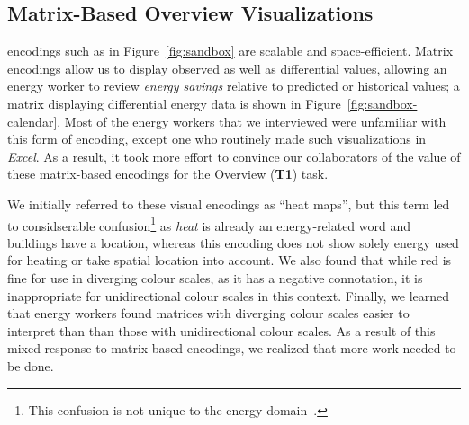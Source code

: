 \documentclass[journal]{vgtc}                %
\newcommand{\bqstart}[1]{\vspace{1mm} \noindent{\textbf{#1}}}
\begin{document}
\subsection{Matrix-Based Overview Visualizations}
\label{design-matrix}


\bqstart{Time series matrix} encodings such as in Figure~\ref{fig:sandbox} are scalable and space-efficient.
Matrix encodings allow us to display observed as well as differential values, allowing an energy worker to review {\it energy savings} relative to predicted or historical values; a matrix displaying differential energy data is shown in Figure~\ref{fig:sandbox-calendar}. 
Most of the energy workers that we interviewed were unfamiliar with this form of encoding, except one who routinely made such visualizations in {\it Excel}. 
As a result, it took more effort to convince our collaborators of the value of these matrix-based encodings for the Overview ({\bf T1}) task.

We initially referred to these visual encodings as ``heat maps'', but this term led to considserable confusion\footnote{This confusion is not unique to the energy domain~\cite{Field2015,Wilkinson2009}.} as {\it heat} is already an energy-related word and buildings have a location, whereas this encoding does not show solely energy used for heating or take spatial location into account.
We also found that while red is fine for use in diverging colour scales, as it has a negative connotation, it is inappropriate for unidirectional colour scales in this context. 
Finally, we learned that energy workers found matrices with diverging colour scales easier to interpret than than those with unidirectional colour scales.
As a result of this mixed response to matrix-based encodings, we realized that more work needed to be done.
\end{document}
